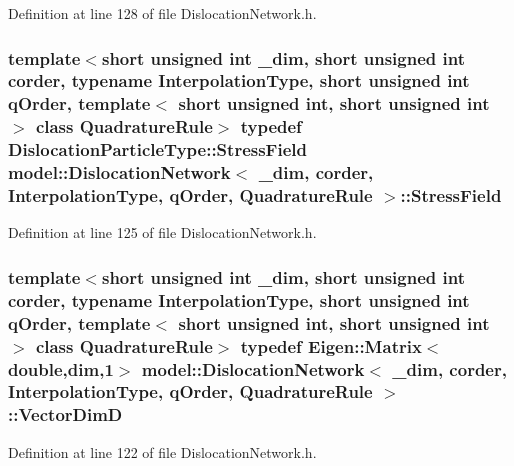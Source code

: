 Definition at line 128 of file Dislocation\+Network.\+h.

\hypertarget{classmodel_1_1_dislocation_network_af03cc04b6ca3727e7802f8f6a984f8e9}{}
\subsubsection[{Stress\+Field}]{\setlength{\rightskip}{0pt plus 5cm}template$<$short unsigned int \+\_\+dim, short unsigned int corder, typename Interpolation\+Type, short unsigned int q\+Order, template$<$ short unsigned int, short unsigned int $>$ class Quadrature\+Rule$>$ typedef {\bf Dislocation\+Particle\+Type\+::\+Stress\+Field} {\bf model\+::\+Dislocation\+Network}$<$ \+\_\+dim, corder, Interpolation\+Type, q\+Order, Quadrature\+Rule $>$\+::{\bf Stress\+Field}}\label{classmodel_1_1_dislocation_network_af03cc04b6ca3727e7802f8f6a984f8e9}


Definition at line 125 of file Dislocation\+Network.\+h.

\hypertarget{classmodel_1_1_dislocation_network_a2825fa02c2f77fd9a08e3b9a2207cb00}{}
\subsubsection[{Vector\+Dim\+D}]{\setlength{\rightskip}{0pt plus 5cm}template$<$short unsigned int \+\_\+dim, short unsigned int corder, typename Interpolation\+Type, short unsigned int q\+Order, template$<$ short unsigned int, short unsigned int $>$ class Quadrature\+Rule$>$ typedef Eigen\+::\+Matrix$<$double,{\bf dim},1$>$ {\bf model\+::\+Dislocation\+Network}$<$ \+\_\+dim, corder, Interpolation\+Type, q\+Order, Quadrature\+Rule $>$\+::{\bf Vector\+Dim\+D}}\label{classmodel_1_1_dislocation_network_a2825fa02c2f77fd9a08e3b9a2207cb00}


Definition at line 122 of file Dislocation\+Network.\+h.



